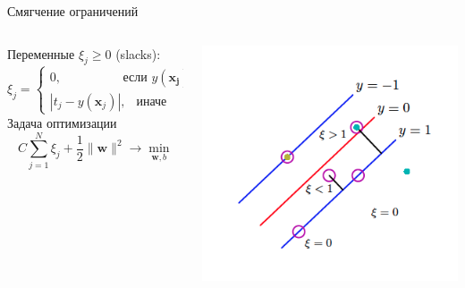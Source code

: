 \documentclass[10pt]{beamer}
\begin{document}
\begin{frame}{Смягчение ограничений}

\begin{columns}[T]
    \begin{column}{.51\textwidth}
    
    Переменные $\xi_j \geq 0$ (slacks):
    \[
    \xi_j = \begin{cases}
    0, \quad\quad\quad\quad\;\;\text{ если }y(\mathbf{x_j}) t_j \geq 1  \\
    |t_j - y(\mathbf{x}_j)|, \;\,\text{ иначе}
    \end{cases}
    \]
    Задача оптимизации
    \[
    C \sum_{j=1}^N \xi_j + \frac{1}{2}\|\mathbf{w}\|^2 \rightarrow \min_{\mathbf{w}, b}
    \]
	
    \end{column}
       
    \begin{column}{.5\textwidth}
    	\vspace{-1em}
		\begin{center}
   			\includegraphics[scale=0.45]{images/slack.png}
    	\end{center}
	\end{column}
\end{columns}
  
\end{frame}
\end{document}
